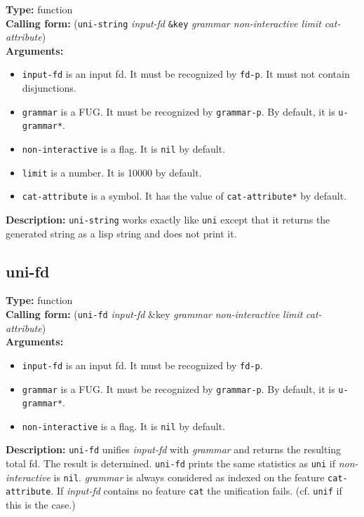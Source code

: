 \documentclass[10pt,a4paper]{report}
\begin{document}
{\bf Type:} function
\\{\bf Calling form:} ({\tt uni-string} {\em input-fd} {\tt \&key} {\em grammar
non-interactive limit cat-attribute})
\\{\bf Arguments:} 
\begin{itemize}
\item {\tt input-fd} is an input fd. It must be recognized by {\tt fd-p}.  It must
not contain disjunctions.  

\item {\tt grammar} is a FUG. It must be recognized by {\tt grammar-p}. By
default, it is {\tt *u-grammar*}.

\item {\tt non-interactive} is a flag. It is {\tt nil} by default.

\item {\tt limit} is a number.  It is 10000 by default.

\item {\tt cat-attribute} is a symbol.  It has the value of {\tt *cat-attribute*} by
default. 
\end{itemize}

{\bf Description:} {\tt uni-string} works exactly like {\tt uni} except that it
returns the generated string as a lisp string and does not print it.


\subsection{uni-fd}

{\bf Type:} function
\\{\bf Calling form:} ({\tt uni-fd} {\em input-fd} \&key {\em grammar} {\em non-interactive} 
{\em limit} {\em cat-attribute})
\\{\bf Arguments:} 
\begin{itemize}
\item {\tt input-fd} is an input fd. It must be recognized by {\tt fd-p}.

\item {\tt grammar} is a FUG. It must be recognized by {\tt grammar-p}. By
default, it is {\tt *u-grammar*}.

\item {\tt non-interactive} is a flag. It is {\tt nil} by default.
\end{itemize}

{\bf Description:} {\tt uni-fd} unifies {\em input-fd} with {\em grammar}
and returns the resulting total fd. The result is determined.
  {\tt uni-fd} prints the same
statistics as {\tt uni} if {\em non-interactive} is {\tt nil}.
{\em grammar} is always considered as indexed on the feature
{\tt cat-attribute}. If {\em input-fd} contains no feature {\tt cat} the
unification fails. (cf. {\tt unif} if this is the case.)
\end{document}
